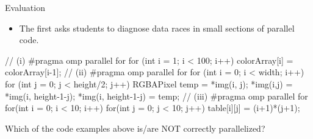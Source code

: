 \documentclass[final,t]{beamer}
\begin{document}
\begin{frame}[fragile]{}
\begin{columns}[t]
\begin{column}{.3\linewidth}
\begin{block}{Evaluation}
\begin{itemize}
                    \item
                    The first asks students to diagnose data races in small
                    sections of parallel code.

                \end{itemize}

                \begin{cppcode}
// (i)
#pragma omp parallel for
for (int i = 1; i < 100; i++)
    colorArray[i] = colorArray[i-1];
// (ii)
#pragma omp parallel for
for (int i = 0; i < width; i++) {
    for (int j = 0; j < height/2; j++) {
        RGBAPixel temp = *img(i, j);
        *img(i,j) = *img(i, height-1-j);
        *img(i, height-1-j) = temp;
    }
}
// (iii)    
#pragma omp parallel for
for(int i = 0; i < 10; i++)
    for(int j = 0; j < 10; j++)
        table[i][j] = (i+1)*(j+1); 
                \end{cppcode}

                Which of the code examples above is/are NOT correctly parallelized?


\end{block}
\end{column}
\end{columns}
\end{frame}
\end{document}
